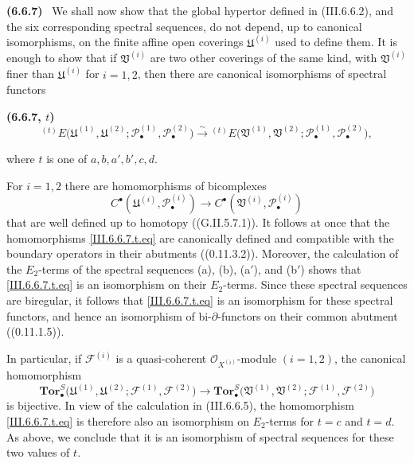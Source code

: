 \documentclass[10pt,oneside]{book}
\newcommand{\sh}[1]{\mathscr{#1}}
\newcommand{\sref}[2][]{(#2)}
\newenvironment{env}[1][]{\par\medskip\noindent\textbf{(#1)}\ }{\par}
\begin{document}
\begin{env}[6.6.7]
\label{III.6.6.7}
We shall now show that the global hypertor defined in
\sref{III.6.6.2}, and the six corresponding spectral sequences,
do not depend, up to canonical isomorphisms, on the finite affine
open coverings $\mathfrak U^{(i)}$ used to define them.  It is
enough to show that if $\mathfrak V^{(i)}$ are two other
coverings of the same kind, with $\mathfrak V^{(i)}$ finer than
$\mathfrak U^{(i)}$ for $i=1,2$, then there are canonical
isomorphisms of spectral functors
\begin{env}[6.6.7, $t$]
\label{III.6.6.7.t}
\[
  {}^{(t)}E
  \bigl(
    \mathfrak U^{(1)},\mathfrak U^{(2)};
    \sh P_\bullet^{(1)},\sh P_\bullet^{(2)}
  \bigr)
  \xrightarrow{\sim}
  {}^{(t)}E
  \bigl(
    \mathfrak V^{(1)},\mathfrak V^{(2)};
    \sh P_\bullet^{(1)},\sh P_\bullet^{(2)}
  \bigr),
  \tag{6.6.7, $t$}\label{III.6.6.7.t.eq}
\]
\end{env}
where $t$ is one of $a,b,a',b',c,d$.

For $i=1,2$ there are homomorphisms of bicomplexes
\[
  C^\bullet
  (\mathfrak U^{(i)},\sh P_\bullet^{(i)})
  \longrightarrow
  C^\bullet
  (\mathfrak V^{(i)},\sh P_\bullet^{(i)})
\]
that are well defined up to homotopy
(\sref[G]{G.II.5.7.1}).  It follows at once that the
homomorphisms \eqref{III.6.6.7.t.eq} are canonically defined and
compatible with the boundary operators in their abutments
(\sref[0]{0.11.3.2}).  Moreover, the calculation of the
$E_2$-terms of the spectral sequences
\textnormal{(a)}, \textnormal{(b)}, \textnormal{(a$'$)}, and
\textnormal{(b$'$)} shows that
\eqref{III.6.6.7.t.eq} is an isomorphism on their $E_2$-terms.
Since these spectral sequences are biregular, it follows that
\eqref{III.6.6.7.t.eq} is an isomorphism for these spectral
functors, and hence an isomorphism of bi-$\partial$-functors on
their common abutment (\sref[0]{0.11.1.5}).

In particular, if $\sh F^{(i)}$ is a quasi-coherent
$\sh O_{X^{(i)}}$-module $(i=1,2)$, the canonical homomorphism
\[
  \mathbf{Tor}_\bullet^S
  \bigl(
    \mathfrak U^{(1)},\mathfrak U^{(2)};
    \sh F^{(1)},\sh F^{(2)}
  \bigr)
  \longrightarrow
  \mathbf{Tor}_\bullet^S
  \bigl(
    \mathfrak V^{(1)},\mathfrak V^{(2)};
    \sh F^{(1)},\sh F^{(2)}
  \bigr)
\]
is bijective.  In view of the calculation in
\sref{III.6.6.5}, the homomorphism
\eqref{III.6.6.7.t.eq} is therefore also an isomorphism on
$E_2$-terms for $t=c$ and $t=d$.  As above, we conclude that it
is an isomorphism of spectral sequences for these two values of
$t$.


\end{env}
\end{document}
